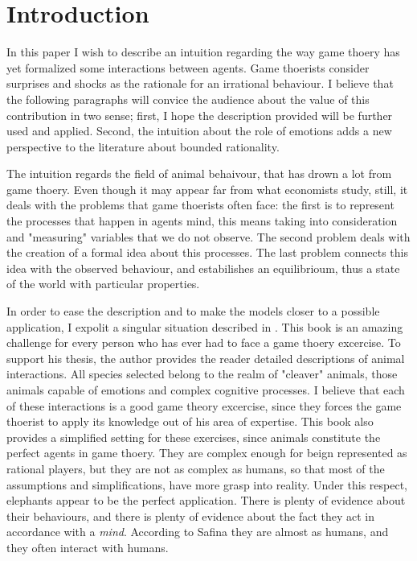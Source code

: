 \section*{Introduction}

In this paper I wish to describe an intuition regarding the way game thoery has yet formalized some interactions between agents. Game thoerists consider surprises and shocks as the rationale for an irrational behaviour. I believe that the following paragraphs will convice the audience about the value of this contribution in two sense; first, I hope the description provided will be further used and applied. Second, the intuition about the role of emotions adds a new perspective to the literature about bounded rationality.

The intuition regards the field of animal behaivour, that has drown a lot from game thoery. Even though it may appear far from what economists study, still, it deals with the problems that game thoerists often face: the first is to represent the processes that happen in agents mind, this means taking into consideration and "measuring" variables that we do not observe. The second problem deals with the creation of a formal idea about this processes. The last problem connects this idea with the observed behaviour, and estabilishes an equilibrioum, thus a state of the world with particular properties.

In order to ease the description and to make the models closer to a possible application, I expolit a singular situation described in \cite{safinaWordsWhatAnimals2015}. This book is an amazing challenge for every person who has ever had to face a game thoery excercise. To support his thesis, the author provides the reader detailed descriptions of animal interactions. All species selected belong to the realm of "cleaver" animals, those animals capable of emotions and complex cognitive processes.
I believe that each of these interactions is a good game theory excercise, since they forces the game thoerist to apply its knowledge out of his area of expertise. This book also provides a simplified setting for these exercises, since animals constitute the perfect agents in game thoery. They are complex enough for beign represented as rational players, but they are not as complex as humans, so that most of the assumptions and simplifications, have more grasp into reality. 
Under this respect, elephants appear to be the perfect application. There is plenty of evidence about their behaviours, and there is plenty of evidence about the fact they act in accordance with a \textit{mind}. According to Safina they are almost as humans, and they often interact with humans.

